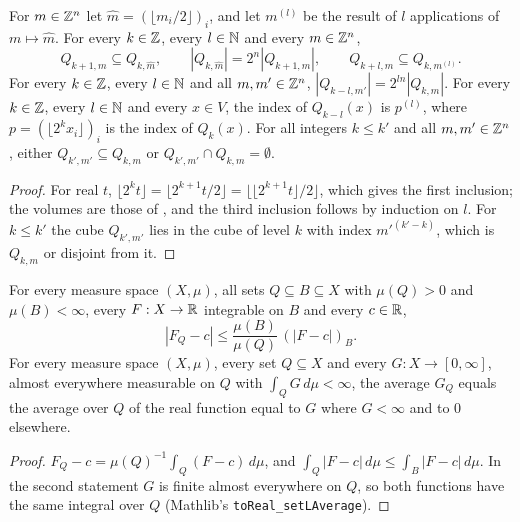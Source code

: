 \begin{lemma}
\label{lem:dyadic-cubes-nested}
\leanok
{}
For $m \in \mathbb{Z}^n$ let $\hat m = (\lfloor m_i / 2 \rfloor)_i$, and let $m^{(l)}$ be the result of
$l$ applications of $m \mapsto \hat m$. For every $k \in \mathbb{Z}$, every $l \in \mathbb{N}$ and every
$m \in \mathbb{Z}^n$,
\[
  Q_{k+1,m} \subseteq Q_{k,\hat m}, \qquad |Q_{k,\hat m}| = 2^n |Q_{k+1,m}|, \qquad
  Q_{k+l,m} \subseteq Q_{k,m^{(l)}}.
\]
For every $k \in \mathbb{Z}$, every $l \in \mathbb{N}$ and all $m, m' \in \mathbb{Z}^n$,
$|Q_{k-l,m'}| = 2^{ln} |Q_{k,m}|$. For every $k \in \mathbb{Z}$, every $l \in \mathbb{N}$ and every $x \in V$,
the index of $Q_{k-l}(x)$ is $p^{(l)}$, where $p = (\lfloor 2^k x_i \rfloor)_i$ is the index of
$Q_k(x)$. For all integers
$k \leq k'$ and all $m, m' \in \mathbb{Z}^n$, either $Q_{k',m'} \subseteq Q_{k,m}$ or
$Q_{k',m'} \cap Q_{k,m} = \emptyset$.
\end{lemma}

\begin{proof}
\leanok
For real $t$, $\lfloor 2^k t \rfloor = \lfloor 2^{k+1} t / 2 \rfloor
= \lfloor \lfloor 2^{k+1} t \rfloor / 2 \rfloor$, which gives the first inclusion; the volumes
are those of , and the third inclusion follows by induction on $l$. For
$k \leq k'$ the cube $Q_{k',m'}$ lies in the cube of level $k$ with index $m'^{(k'-k)}$, which is
$Q_{k,m}$ or disjoint from it.
\end{proof}

\begin{lemma}
\label{lem:average-subset}
\leanok
For every measure space $(X, \mu)$, all sets $Q \subseteq B \subseteq X$ with $\mu(Q) > 0$ and
$\mu(B) < \infty$, every $F : X \to \mathbb{R}$ integrable on $B$ and every $c \in \mathbb{R}$,
\[
  |F_Q - c| \leq \frac{\mu(B)}{\mu(Q)} \, (|F - c|)_B .
\]
For every measure space $(X, \mu)$, every set $Q \subseteq X$ and every $G : X \to [0, \infty]$,
almost everywhere measurable on $Q$ with $\int_Q G \, d\mu < \infty$, the average $G_Q$ equals the
average over $Q$ of the real function equal to $G$ where $G < \infty$ and to $0$ elsewhere.
\end{lemma}

\begin{proof}
\leanok
$F_Q - c = \mu(Q)^{-1} \int_Q (F - c) \, d\mu$, and
$\int_Q |F - c| \, d\mu \leq \int_B |F - c| \, d\mu$. In the second statement $G$ is finite almost
everywhere on $Q$, so both functions have the same integral over $Q$ (Mathlib's
\texttt{toReal\_setLAverage}).
\end{proof}

